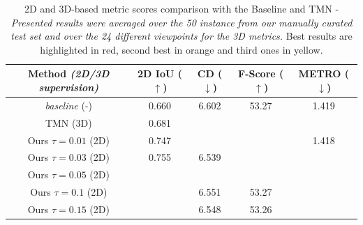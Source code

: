 \begin{table}[htp!]
    \caption{2D and 3D-based metric scores comparison with the Baseline and TMN \citep{pan2019deep} - \textit{Presented results were averaged over the 50 instance from our manually curated test set and over the 24 different viewpoints for the 3D metrics.} Best results are highlighted in \colorbox{red!25}{red}, second best in \colorbox{orange!25}{orange} and third ones in \colorbox{yellow!25}{yellow}.}
    \label{tab:sota_table}
    \begin{center}
    \centering
    \begin{adjustbox}{width=\textwidth}
    \begin{tabular}[h]{c||cccc}
    \hline
    Method \textit{(2D/3D supervision)} &  2D IoU ($\uparrow$) & CD ($\downarrow$) & F-Score ($\uparrow$) & METRO ($\downarrow$) \\[.5pt]
    \hline
    \textit{baseline} (-)& 0.660  &  6.602  & 53.27  &  1.419  \\[1.5pt]
    TMN \citep{pan2019deep} (3D)  & 0.681  & \cellcolor{red!25}{6.328}   & \cellcolor{red!25}{54.23}  & \cellcolor{red!25}{1.293} \\
    \hline 
    Ours $\scriptstyle \tau=0.01$ (2D) & 0.747 &\cellcolor{yellow!25}{6.541}  &  \cellcolor{orange!25}{53.39} &  1.418      \\
    Ours $\scriptstyle \tau=0.03$ (2D) & 0.755 &6.539  & \cellcolor{orange!25}{53.39}  &    \cellcolor{yellow!25}{1.417}  \\
    Ours $\scriptstyle \tau=0.05$ (2D) & \cellcolor{yellow!25}{0.763} & \cellcolor{orange!25}{6.540}  &  \cellcolor{yellow!25}{53.34} &   \cellcolor{yellow!25}{1.417}     \\
    Ours $\scriptstyle \tau=0.1$ (2D)& \cellcolor{red!25}{0.778} & 6.551  & 53.27 &  \cellcolor{orange!25}{1.416}     \\
    Ours $\scriptstyle \tau=0.15$ (2D)& \cellcolor{orange!25}{0.771} & 6.548  & 53.26  &    \cellcolor{orange!25}{1.416}   \\
    \hline 
    \end{tabular}
    \end{adjustbox}
    \end{center}
    
    \end{table}

